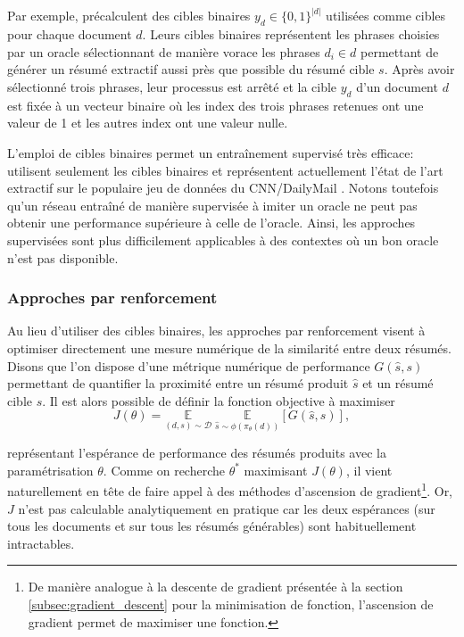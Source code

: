 Par exemple, \citet{10.5555/3298483.3298681} précalculent des cibles binaires $y_d \in \{0,1\}^{|d|}$
utilisées comme cibles pour chaque document $d$.
Leurs cibles binaires représentent les phrases choisies par un oracle
sélectionnant de manière vorace les phrases $d_i \in d$ permettant de générer
un résumé extractif aussi près que possible du résumé cible $s$.
Après avoir sélectionné trois phrases, leur processus est arrêté et la cible $y_d$
d'un document $d$ est fixée à un vecteur binaire où les index des trois phrases 
retenues ont une valeur de 1 et les autres index ont une valeur nulle.

L'emploi de cibles binaires permet un entraînement supervisé très efficace:
\citet{liu2019text} utilisent seulement les cibles binaires
et représentent actuellement l'état de l'art extractif 
sur le populaire jeu de données du CNN/DailyMail \citep{hermann2015teaching}.
Notons toutefois qu'un réseau entraîné de manière supervisée à 
imiter un oracle ne peut pas obtenir une performance supérieure 
à celle de l'oracle.
Ainsi, les approches supervisées sont plus difficilement applicables
à des contextes où un bon oracle n'est pas disponible.

\subsubsection*{Approches par renforcement}
\label{subsec:rl_summ}

Au lieu d'utiliser des cibles binaires, les approches par renforcement visent à
optimiser directement une mesure numérique de la similarité entre deux résumés.
Disons que l'on dispose d'une métrique numérique de performance $G(\hat{s}, s)$
permettant de quantifier la proximité entre un résumé produit $\hat{s}$ et un résumé
cible $s$.
Il est alors possible de définir la fonction objective à maximiser
\begin{equation}
    J(\theta) = \underset{(d,s) \sim \mathcal{D}}{\mathbb{E}} \; \underset{\hat{s} \sim \phi(\pi_\theta(d))}{\mathbb{E}} \left[G(\hat{s}, s) \right],
    \label{eq:REINFORCE_expectation}
\end{equation}

représentant l'espérance de performance des résumés produits avec la paramétrisation $\theta$.
Comme on recherche $\theta^*$ maximisant $J(\theta)$, il vient naturellement en tête
de faire appel à des méthodes d'ascension de gradient\footnote{De manière analogue à
la descente de gradient présentée à la section \ref{subsec:gradient_descent} pour la minimisation
de fonction, l'ascension de gradient permet de maximiser une fonction.}.
Or, $J$ n'est pas calculable analytiquement en pratique car les deux espérances (sur
tous les documents et sur tous les résumés générables) sont habituellement intractables.

